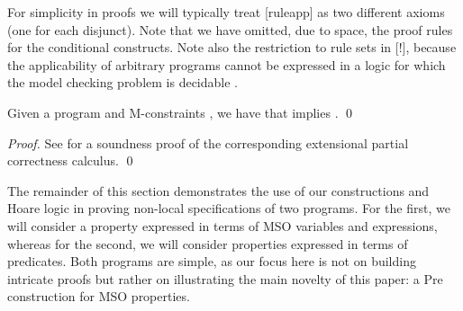 \documentclass{llncs}
\begin{document}
	 For simplicity in proofs we will typically treat [ruleapp] as two different axioms (one for each disjunct). Note that we have omitted, due to space, the proof rules for the conditional constructs. Note also the restriction to rule sets in [!], because the applicability of arbitrary programs cannot be expressed in a logic for which the model checking problem is decidable \cite{Poskitt13a}.
	
	\begin{theorem}[Soundness]\rm
		Given a program  and M-constraints , we have that  implies .
		\qed
	\end{theorem}
	
\begin{proof}
	See \cite{Poskitt13a} for a soundness proof of the corresponding extensional partial correctness calculus.
	\qed
\end{proof}	
	
	
	
	The remainder of this section demonstrates the use of our constructions and Hoare logic in proving non-local specifications of two programs. For the first, we will consider a property expressed in terms of MSO variables and expressions, whereas for the second, we will consider properties expressed in terms of  predicates. Both programs are simple, as our focus here is not on building intricate proofs but rather on illustrating the main novelty of this paper: a Pre construction for MSO properties.
	
\end{document}
